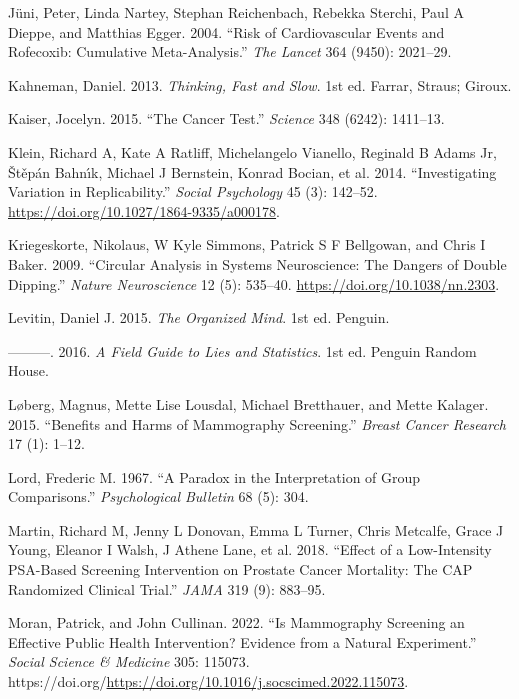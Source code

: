 \documentclass[
  10ptls,
  b5paper]{book}
\newlength{\cslhangindent}
\newenvironment{CSLReferences}[2] %
 {\begin{list}{}{%
  \setlength{\itemindent}{0pt}
  \setlength{\leftmargin}{0pt}
  \setlength{\parsep}{0pt}
  \ifodd #1
   \setlength{\leftmargin}{\cslhangindent}
   \setlength{\itemindent}{-1\cslhangindent}
  \fi
  \setlength{\itemsep}{#2\baselineskip}}}
 {\end{list}}
\begin{document}
\begin{CSLReferences}{1}{0}
Jüni, Peter, Linda Nartey, Stephan Reichenbach, Rebekka Sterchi, Paul A Dieppe, and Matthias Egger. 2004. {``Risk of Cardiovascular Events and Rofecoxib: Cumulative Meta-Analysis.''} \emph{The Lancet} 364 (9450): 2021--29.

Kahneman, Daniel. 2013. \emph{Thinking, Fast and Slow}. 1st ed. Farrar, Straus; Giroux.

Kaiser, Jocelyn. 2015. {``The Cancer Test.''} \emph{Science} 348 (6242): 1411--13.

Klein, Richard A, Kate A Ratliff, Michelangelo Vianello, Reginald B Adams Jr, Štěpán Bahnı́k, Michael J Bernstein, Konrad Bocian, et al. 2014. {``Investigating Variation in Replicability.''} \emph{Social Psychology} 45 (3): 142--52. \url{https://doi.org/10.1027/1864-9335/a000178}.

Kriegeskorte, Nikolaus, W Kyle Simmons, Patrick S F Bellgowan, and Chris I Baker. 2009. {``Circular Analysis in Systems Neuroscience: The Dangers of Double Dipping.''} \emph{Nature Neuroscience} 12 (5): 535--40. \url{https://doi.org/10.1038/nn.2303}.

Levitin, Daniel J. 2015. \emph{The Organized Mind}. 1st ed. Penguin.

---------. 2016. \emph{A Field Guide to Lies and Statistics}. 1st ed. Penguin Random House.

Løberg, Magnus, Mette Lise Lousdal, Michael Bretthauer, and Mette Kalager. 2015. {``Benefits and Harms of Mammography Screening.''} \emph{Breast Cancer Research} 17 (1): 1--12.

Lord, Frederic M. 1967. {``A Paradox in the Interpretation of Group Comparisons.''} \emph{Psychological Bulletin} 68 (5): 304.

Martin, Richard M, Jenny L Donovan, Emma L Turner, Chris Metcalfe, Grace J Young, Eleanor I Walsh, J Athene Lane, et al. 2018. {``Effect of a Low-Intensity PSA-Based Screening Intervention on Prostate Cancer Mortality: The CAP Randomized Clinical Trial.''} \emph{JAMA} 319 (9): 883--95.

Moran, Patrick, and John Cullinan. 2022. {``Is Mammography Screening an Effective Public Health Intervention? Evidence from a Natural Experiment.''} \emph{Social Science \& Medicine} 305: 115073. https://doi.org/\url{https://doi.org/10.1016/j.socscimed.2022.115073}.


\end{CSLReferences}
\end{document}
